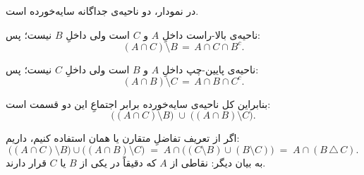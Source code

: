 
در نمودار، دو ناحیه‌ی جداگانه سایه‌خورده است.

ناحیه‌ی بالا-راست داخلِ $A$ و $C$ است ولی داخلِ $B$ نیست؛ پس:
\[
(A\cap C)\setminus B \,=\, A\cap C\cap B^{c}.
\]

ناحیه‌ی پایین-چپ داخلِ $A$ و $B$ است ولی داخلِ $C$ نیست؛ پس:
\[
(A\cap B)\setminus C \,=\, A\cap B\cap C^{c}.
\]

بنابراین کل ناحیه‌ی سایه‌خورده برابر اجتماعِ این دو قسمت است:
\[
\big((A\cap C)\setminus B\big)\;\cup\;\big((A\cap B)\setminus C\big).
\]

اگر از تعریف تفاضلِ متقارن یا همان  استفاده کنیم، داریم:
\[
\big((A\cap C)\setminus B\big)\cup\big((A\cap B)\setminus C\big)
\;=\;
A\cap\big((C\setminus B)\cup(B\setminus C)\big)
\;=\;
A\cap (B\,\triangle\,C).
\]
به بیان دیگر: نقاطی از $A$ که دقیقاً در یکی از $B$ یا $C$ قرار دارند.

